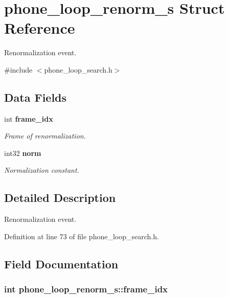 \section{phone\-\_\-loop\-\_\-renorm\-\_\-s Struct Reference}
\label{structphone__loop__renorm__s}


Renormalization event.  




{\ttfamily \#include $<$phone\-\_\-loop\-\_\-search.\-h$>$}

\subsection*{Data Fields}
\begin{DoxyCompactItemize}
\item 
int {\bf frame\-\_\-idx}
\begin{DoxyCompactList}\small\item\em Frame of renormalization. \end{DoxyCompactList}\item 
int32 {\bf norm}
\begin{DoxyCompactList}\small\item\em Normalization constant. \end{DoxyCompactList}\end{DoxyCompactItemize}


\subsection{Detailed Description}
Renormalization event. 

Definition at line 73 of file phone\-\_\-loop\-\_\-search.\-h.



\subsection{Field Documentation}
\subsubsection[{frame\-\_\-idx}]{\setlength{\rightskip}{0pt plus 5cm}int phone\-\_\-loop\-\_\-renorm\-\_\-s\-::frame\-\_\-idx}\label{structphone__loop__renorm__s_af54c31c6d417b769b088b898294a135e}


